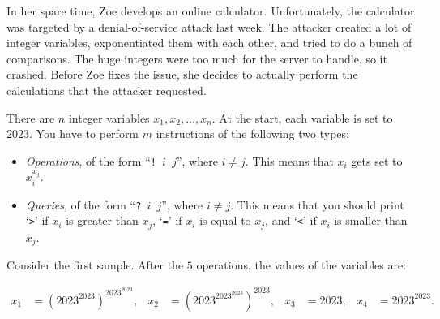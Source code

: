

%
%
%
%
%
In her spare time, Zoe develops an online calculator.
Unfortunately, the calculator was targeted by a denial-of-service attack last week.
The attacker created a lot of integer variables, exponentiated them with each other,
and tried to do a bunch of comparisons. The huge integers were too much for the server to handle, so it
crashed. Before Zoe fixes the issue, she decides to actually perform the calculations that the attacker
requested.


There are $n$ integer variables $x_1, x_2, \dots, x_n$. At the start, each variable is set to $2023$.
You have to perform $m$ instructions of the following two types:
\begin{itemize}
\item \textit{Operations}, of the form ``\texttt{!~$i$~$j$}'', where $i \neq j$.
    This means that $x_i$ gets set to $x_i^{x_j}$.
\item \textit{Queries}, of the form ``\texttt{?~$i$~$j$}'', where $i \neq j$.
    This means that you should print `\verb|>|' if $x_i$ is greater than $x_j$, `\verb|=|' if $x_i$ is equal to
    $x_j$, and `\verb|<|' if $x_i$ is smaller than $x_j$.
\end{itemize}

Consider the first sample. After the $5$ operations, the values of the variables are:

\begin{align*}
x_1&=\left({2023}^{2023}\right)^{{2023}^{2023}},&
x_2&=\left({2023}^{{2023}^{2023}}\right)^{2023},&
x_3&={2023},&
x_4&={2023}^{2023}.
\end{align*}

%

